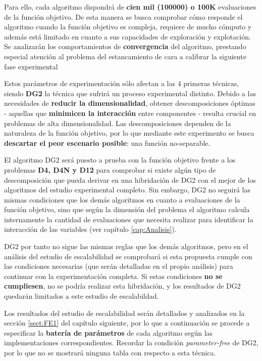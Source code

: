 Para ello, cada algoritmo dispondrá de \textbf{cien mil (100000) o 100K} evaluaciones de la función objetivo. De esta manera se busca comprobar cómo responde el algoritmo cuando la función objetivo es compleja, requiere de mucho cómputo y además está limitado en cuanto a sus capacidades de exploración y explotación. Se analizarán los comportamientos de \textbf{convergencia} del algoritmo, prestando especial atención al problema del estancamiento de cara a calibrar la siguiente fase experimental

Estos parámetros de experimentación sólo afectan a las 4 primeras técnicas, siendo \textbf{DG2} la técnica que sufrirá un proceso experimental distinto. Debido a las necesidades de\textbf{ reducir la dimensionalidad}, obtener descomposiciones óptimas - aquellas que \textbf{minimicen la interacción} entre componentes - resulta crucial en problemas de alta dimensionalidad. Las descomposiciones dependen de la naturaleza de la función objetivo, por lo que mediante este experimento se busca \textbf{descartar el peor escenario posible}: una función no-separable.

El algoritmo DG2 será puesto a prueba con la función objetivo frente a los problemas \textbf{D4, D4N y D12} para comprobar si existe algún tipo de descomposición que pueda derivar en una hibridación de DG2 con el mejor de los algoritmos del estudio experimental completo. Sin embargo, DG2 no seguirá las mismas condiciones que los demás algoritmos en cuanto a evaluaciones de la función objetivo, sino que según la dimensión del problema el algoritmo calcula internamente la cantidad de evaluaciones que necesita realizar para identificar la interacción de las variables (ver capítulo \ref{cap:Analisis}).

DG2 por tanto no sigue las mismas reglas que los demás algoritmos, pero en el análisis del estudio de escalabilidad se comprobará si esta propuesta cumple con las condiciones necesarias (que serán detalladas en el propio análisis) para continuar con la experimentación completa. Si estas condiciones \textbf{no se cumpliesen}, no se podría realizar esta hibridación, y los resultados de DG2 quedarán limitados a este estudio de escalabildad. 

Los resultados del estudio de escalabilidad serán detallados y analizados en la sección \ref{sect:FE1} del capítulo siguiente, por lo que a continuación se procede a especificar la \textbf{batería de parámetros} de cada algoritmo según las implementaciones correspondientes. Recordar la condición \textit{parameter-free} de DG2, por lo que no se mostrará ninguna tabla con respecto a esta técnica.

